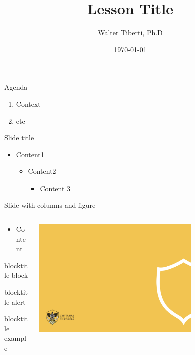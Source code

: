 \documentclass{univaqslides}
\title{Lesson Title}
\author{Walter Tiberti, Ph.D}
\date{\today}
\begin{document}
	\univaqtitlepage
	
	\begin{frame}{Agenda}
		\begin{enumerate}
			\item Context
			\item etc
		\end{enumerate}
	\end{frame}
	
	\begin{frame}{Slide title}
	\begin{itemize}
		\item Content1
		\begin{itemize}
			\item Content2
			\begin{itemize}
				\item Content 3
			\end{itemize}
		\end{itemize}
	\end{itemize}
	\end{frame}


	\begin{frame}{Slide with columns and figure}
		\begin{columns}
			\begin{column}{0.5\textwidth}
				\begin{itemize}
					\item Content
				\end{itemize}
				\begin{block}{blocktitle}		block		\end{block}
				\begin{alertblock}{blocktitle}		alert		\end{alertblock}
				\begin{exampleblock}{blocktitle}		example		\end{exampleblock}
			\end{column}
			\begin{column}{0.5\textwidth}
				\includegraphics[width=0.7\textwidth]{imgs/back43.png}
			\end{column}
		\end{columns}
	\end{frame}
\end{document}
